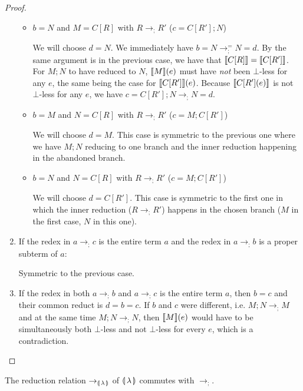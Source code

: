 \begin{proof}
\begin{enumerate}
\begin{itemize}
    \item $b = N$ and $M = C[R]$ with $R \to_; R'$ ($c = C[R']; N$)

      We will choose $d = N$. We immediately have $b = N \to_;^= N = d$. By
      the same argument is in the previous case, we have that
      $\llbracket C[R] \rrbracket = \llbracket C[R'] \rrbracket$. For $M; N$ to have reduced to $N$,
      $\llbracket M \rrbracket(e)$ must have \emph{not} been $\bot$-less for any $e$, the
      same being the case for $\llbracket C[R'] \rrbracket(e)$. Because $\llbracket C[R'](e) \rrbracket$ is
      not $\bot$-less for any $e$, we have $c = C[R']; N \to_; N = d$.

    \item $b = M$ and $N = C[R]$ with $R \to_; R'$ ($c = M; C[R']$)

      We will choose $d = M$. This case is symmetric to the previous one
      where we have $M; N$ reducing to one branch and the inner reduction
      happening in the abandoned branch.

    \item $b = N$ and $N = C[R]$ with $R \to_; R'$ ($c = M; C[R']$)

      We will choose $d = C[R']$. This case is symmetric to the first one
      in which the inner reduction ($R \to_; R'$) happens in the chosen
      branch ($M$ in the first case, $N$ in this one).
    \end{itemize}

  \item If the redex in $a \to_; c$ is the entire term $a$ and the redex in
    $a \to_; b$ is a proper subterm of $a$:

    Symmetric to the previous case.

  \item If the redex in both $a \to_; b$ and $a \to_; c$ is the entire term
    $a$, then $b = c$ and their common reduct is $d = b = c$. If $b$ and
    $c$ were different, i.e. $M; N \to_; M$ and at the same time
    $M; N \to_; N$, then $\llbracket M \rrbracket(e)$ would have to be simultaneously both
    $\bot$-less and not $\bot$-less for every $e$, which is a
    contradiction.
  \end{enumerate}
\end{proof}

\begin{lemma}\label{lem:semicolon-commutes}
  The reduction relation $\to_{\llparenthesis \, \lambda \, \rrparenthesis}$ of ${\llparenthesis \, \lambda \, \rrparenthesis}$ commutes with $\to_;$.
\end{lemma}

